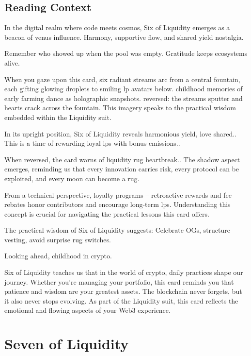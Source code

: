 \documentclass[11pt,oneside]{book}
\begin{document}
\begin{minipage}[t]{0.55\textwidth}
  \subsection*{Reading Context}
  In the digital realm where code meets cosmos, Six of Liquidity emerges as a beacon of venus influence. Harmony, supportive flow, and shared yield nostalgia.

  Remember who showed up when the pool was empty. Gratitude keeps ecosystems alive.

  When you gaze upon this card, six radiant streams arc from a central fountain, each gifting glowing droplets to smiling lp avatars below. childhood memories of early farming dance as holographic snapshots. reversed: the streams sputter and hearts crack across the fountain. This imagery speaks to the practical wisdom embedded within the Liquidity suit.

  In its upright position, Six of Liquidity reveals harmonious yield, love shared.. This is a time of rewarding loyal lps with bonus emissions..

  When reversed, the card warns of liquidity rug heartbreak.. The shadow aspect emerges, reminding us that every innovation carries risk, every protocol can be exploited, and every moon can become a rug.

  From a technical perspective, loyalty programs – retroactive rewards and fee rebates honor contributors and encourage long-term lps. Understanding this concept is crucial for navigating the practical lessons this card offers.

  The practical wisdom of Six of Liquidity suggests: Celebrate OGs, structure vesting, avoid surprise rug switches.

  Looking ahead, childhood in crypto.

  Six of Liquidity teaches us that in the world of crypto, daily practices shape our journey. Whether you're managing your portfolio, this card reminds you that patience and wisdom are your greatest assets. The blockchain never forgets, but it also never stops evolving. As part of the Liquidity suit, this card reflects the emotional and flowing aspects of your Web3 experience.

\end{minipage}

\newpage
\section*{Seven of Liquidity}
\end{document}
